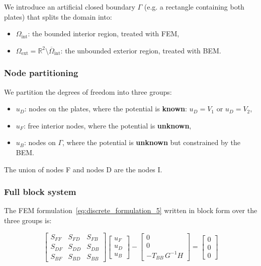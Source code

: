 \documentclass[11pt,onecolumn]{article}
\begin{document}
We introduce an artificial closed boundary $\Gamma$ (e.g. a rectangle containing both plates) 
that splits the domain into:
\begin{itemize}
    \item $\Omega_{\text{int}}$: the bounded interior region, treated with FEM,
    \item $\Omega_{\text{ext}} = \mathbb{R}^2 \setminus \overline{\Omega}_{\text{int}}$: 
    the unbounded exterior region, treated with BEM.
\end{itemize}

\subsubsection{Node partitioning}

We partition the degrees of freedom into three groups:
\begin{itemize}
    \item $u_D$: nodes on the plates, where the potential is \textbf{known}: $u_D = V_1$ or $u_D = V_2$,
    \item $u_F$: free interior nodes, where the potential is \textbf{unknown},
    \item $u_B$: nodes on $\Gamma$, where the potential is \textbf{unknown} but constrained by the BEM.
\end{itemize}

The union of nodes F and nodes D are the nodes I.

\subsubsection{Full block system}

The FEM formulation~\eqref{eq:discrete_formulation_5} written in block form over the three groups is:

\begin{equation}
\begin{bmatrix}
S_{FF} & S_{FD} & S_{FB} \\
S_{DF} & S_{DD} & S_{DB} \\
S_{BF} & S_{BD} & S_{BB}
\end{bmatrix}
\begin{bmatrix}
u_F \\ u_D \\ u_B
\end{bmatrix}
-
\begin{bmatrix}
0 \\ 0 \\ -T_{BB}\,G^{-1}H
\end{bmatrix}
= \begin{bmatrix}
0 \\ 0 \\ 0
\end{bmatrix}
\label{eq:full_block_system}
\end{equation}
\end{document}
